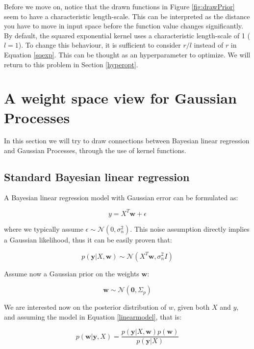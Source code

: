 \documentclass[10pt,a4paper,twoside]{book}
\begin{document}
Before we move on, notice that the drawn functions in Figure \ref{fig:drawPrior} seem to have a characteristic length-scale. This can be interpreted as the distance you have to move in input space before the function value changes significantly. By default, the squared exponential kernel uses a characteristic length-scale of 1 ($l = 1$). To change this behaviour, it is sufficient to consider $r/l$ instead of $r$ in Equation \ref{sqexp}. This can be thought as an hyperparameter to optimize. We will return to this problem in Section \ref{hyperopt}.

\section{A weight space view for Gaussian Processes}

In this section we will try to draw connections between Bayesian linear regression \cite{Bolstad2007} and  Gaussian Processes, through the use of kernel functions. 

\subsection{Standard Bayesian linear regression}

A Bayesian linear regression model with Gaussian error can be formulated as:

\begin{equation}
\label{linearmodel}
y = X^T \boldsymbol{w} + \epsilon
\end{equation} 

where we typically assume $\epsilon \sim \mathcal{N}(0, \sigma_n^2)$. This noise assumption directly implies a Gaussian likelihood, thus it can be easily proven that:

\begin{equation}
p(\boldsymbol{y}|X, \boldsymbol{w}) \sim \mathcal{N} (X^T\boldsymbol{w}, \sigma_n^2 I)
\end{equation}

Assume now a Gaussian prior on the weights $\boldsymbol{w}$:

\begin{equation}
\label{wprior}
\boldsymbol{w} \sim \mathcal{N}(\boldsymbol{0}, \Sigma_p)
\end{equation}

We are interested now on the posterior distribution of $w$, given both $X$ and $y$, and assuming the model in Equation \ref{linearmodel}, that is:

\begin{equation}
p(\boldsymbol{w}|\boldsymbol{y}, X) = \dfrac{p(\boldsymbol{y}|X, \boldsymbol{w}) p(\boldsymbol{w})}{p(\boldsymbol{y}| X)}
\end{equation}
\end{document}
